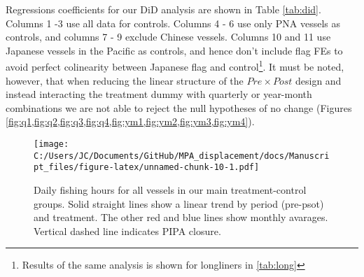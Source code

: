 \documentclass[11pt,]{article}
\let\rmarkdownfootnote\footnote%
\def\footnote{\protect\rmarkdownfootnote}
\begin{document}
Regressions coefficients for our DiD analysis are shown in Table
\ref{tab:did}. Columns 1 -3 use all data for controls. Columns 4 - 6 use
only PNA vessels as controls, and columns 7 - 9 exclude Chinese vessels.
Columns 10 and 11 use Japanese vessels in the Pacific as controls, and
hence don't include flag FEs to avoid perfect colinearity between
Japanese flag and
control\footnote{Results of the same analysis is shown for longliners in \ref{tab:long}}.
It must be noted, however, that when reducing the linear structure of
the \(Pre \times Post\) design and instead interacting the treatment
dummy with quarterly or year-month combinations we are not able to
reject the null hypotheses of no change (Figures
\ref{fig:q1,fig:q2,fig:q3,fig:q4,fig:ym1,fig:ym2,fig:ym3,fig:ym4}).

\begin{figure}
\centering
\texttt{[image: C:/Users/JC/Documents/GitHub/MPA\_displacement/docs/Manuscript\_files/figure-latex/unnamed-chunk-10-1.pdf]}
\caption{\label{fig:unnamed-chunk-10}\label{fig:all_vessels}Daily fishing
hours for all vessels in our main treatment-control groups. Solid
straight lines show a linear trend by period (pre-psot) and treatment.
The other red and blue lines show monthly avarages. Vertical dashed line
indicates PIPA closure.}
\end{figure}
\end{document}
